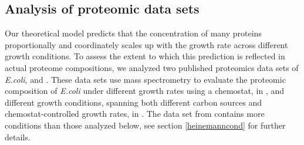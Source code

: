 \subsection{Analysis of proteomic data sets}
Our theoretical model predicts that the concentration of many proteins proportionally and coordinately scales up with the growth rate across different growth conditions.
To assess the extent to which this prediction is reflected in actual proteome compositions, we analyzed two published proteomics data sets of \emph{E.coli}, \cite{Valgepea2013} and \cite{Heinemann2015}.
These data sets use mass spectrometry to evaluate the proteomic composition of \emph{E.coli} under \vConds{} different growth rates using a chemostat, in \cite{Valgepea2013}, and \hConds{} different growth conditions, spanning both different carbon sources and chemostat-controlled growth rates, in \cite{Heinemann2015}.
The data set from \cite{Heinemann2015} contains more conditions than those analyzed below, see section \ref{heinemanncond} for further details.